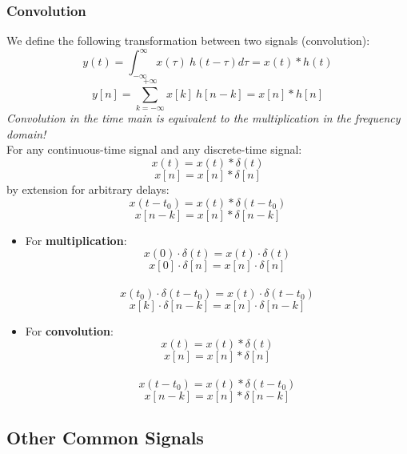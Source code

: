 \subsubsection{Convolution}
We define the following transformation between two signals (convolution):
\[ y(t) = \int_{-\infty}^{\infty} x(\tau) \ h(t-\tau)d\tau = x(t)*h(t) \]
\[ y[n] = \sum_{k=-\infty}^{+\infty}x[k] \ h[n-k] = x[n]*h[n] \]
\textit{Convolution in the time main is equivalent to the multiplication in the frequency domain!} \\

For any continuous-time signal and any discrete-time signal:
\[ x(t) = x(t) * \delta(t) \]
\[ x[n] = x[n] * \delta[n] \]
by extension for arbitrary delays:
\[ x(t-t_{0}) = x(t) * \delta(t-t_{0}) \]
\[ x[n-k] = x[n] * \delta[n-k] \]

\begin{tcolorbox}[title=Summary of properties of the unit impulse, breakable]
 \begin{itemize}
  \item For \textbf{multiplication}:
   \[ x(0)\cdot \delta(t) = x(t)\cdot \delta(t) \]
   \[ x[0]\cdot \delta[n] = x[n]\cdot \delta[n] \]
\ \\ 
   \[ x(t_{0})\cdot \delta(t-t_{0}) = x(t)\cdot \delta(t-t_{0}) \]
   \[ x[k]\cdot \delta[n-k] = x[n] \cdot \delta[n-k] \]
  \item For \textbf{convolution}:
   \[ x(t) = x(t)*\delta(t) \]
   \[ x[n] = x[n]*\delta[n] \]
\ \\
   \[  x(t-t_{0}) = x(t)* \delta(t-t_{0}) \]
   \[ x[n-k] = x[n]*\delta[n-k] \]
 \end{itemize}
\end{tcolorbox} 


\subsection{Other Common Signals}
